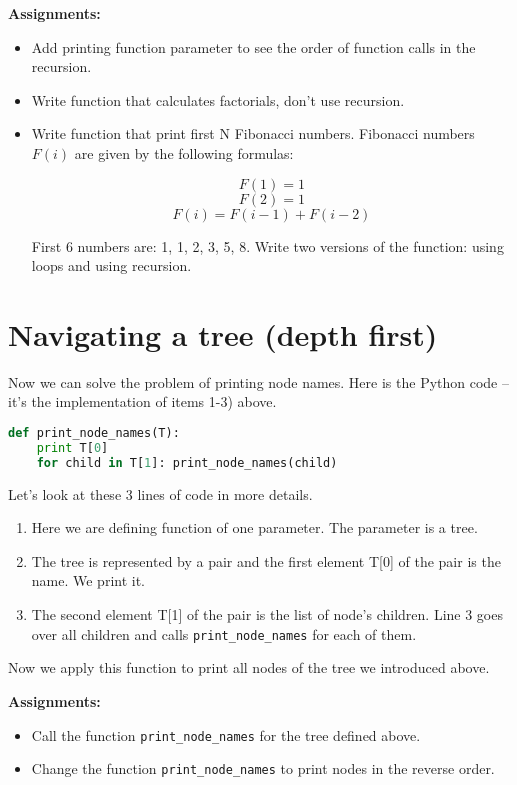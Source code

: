 \bigskip
\begin{tcolorbox}
\textbf{Assignments:}
\begin{itemize}
\item Add printing function parameter to see the order of function calls
in the recursion.
\item Write function that calculates factorials, don't use recursion.
\item Write function that print first N Fibonacci numbers. 
Fibonacci numbers $F(i)$ are given by the following
formulas:

$$F(1) = 1$$ $$F(2) = 1$$ $$F(i) = F(i-1) + F(i-2) $$

First 6 numbers are: 1, 1, 2, 3, 5, 8.
Write two versions of the function: using loops and using recursion.
\end{itemize}
\end{tcolorbox}


\section{Navigating a tree (depth first)}
Now we can solve the problem of printing node names.
Here is the Python code --
it's the implementation of items 1-3) above.

\begin{lstlisting}[style=codelst,language=Python,caption={Python: printing node names (depth first)}]
def print_node_names(T):
    print T[0]
    for child in T[1]: print_node_names(child)
\end{lstlisting}

Let's look at these 3 lines of code in more details.

\begin{leftborder}
\begin{enumerate}
\item Here we are defining function of one parameter. The parameter is a tree.
\item The tree is represented by a pair and the first element T[0] of
the pair is the name. We print it.
\item The second element T[1] of the pair is the list of node's children. 
Line 3 goes over all children and calls
\lstinline{print_node_names} for each of them.
\end{enumerate}
\end{leftborder}

Now we apply this function to print all nodes of the tree we introduced above.
\bigskip
\begin{tcolorbox}
\textbf{Assignments:}
\begin{itemize}
\item Call the function \lstinline{print_node_names}
for the tree defined above. 
\item Change the function \lstinline{print_node_names}
to print nodes in the reverse order.
\end{itemize}
\end{tcolorbox}


